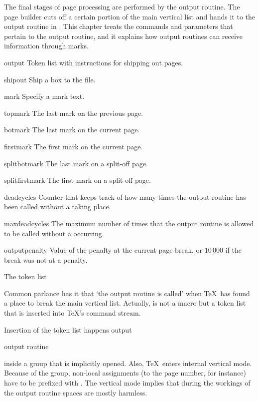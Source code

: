 The final stages of page processing are performed by the
output routine. The page builder cuts off a certain portion
of the main vertical list and hands it to the output routine
in . This chapter treats the commands and parameters
that pertain to the output routine, and it explains how
output routines can receive information through marks.

\invent
\item output 
      Token list with instructions for shipping out pages.

\item shipout 
      Ship a box to the  file.


\item mark 
      Specify a mark text.

\item topmark 
      The last mark on the previous page.

\item botmark 
      The last mark on the current page.

\item firstmark 
      The first mark on the current page.

\item splitbotmark 
      The last mark on a split-off page.

\item splitfirstmark 
      The first mark on a split-off page.

\item deadcycles 
      Counter that keeps track of how many times 
      the output routine has been called without a  
      taking place. 

\item maxdeadcycles 
      The maximum number of times that the output routine is allowed to
      be called without a  occurring.

\item outputpenalty 
      Value of the penalty at the current page break,
 \alt
      or $10\,000$ if the break was not at a penalty.

\inventstop


\point The \cs{\output} token list

Common parlance has it that
`the output routine is called' when \TeX\ has found a place
to break the main vertical list.
Actually,  is not a macro but a token list that
is inserted into \TeX's command stream.

Insertion of the  token list happens
\csterm output\par\term output routine\par
inside a group that is implicitly opened.
Also, \TeX\ enters internal vertical mode.
Because of the group, non-local assignments 
(to the page number, for instance)
have to be prefixed with .
The vertical mode implies that during the workings of the 
output routine 
spaces are mostly harmless.

